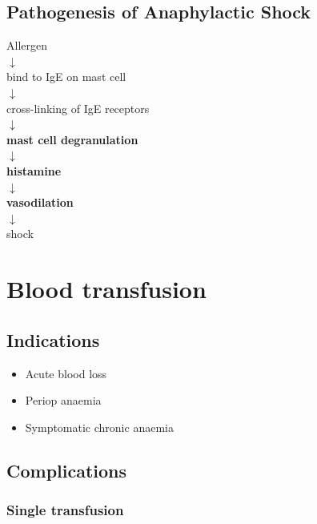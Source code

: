 \documentclass[
  14pt,
]{memoir}
\providecommand{\tightlist}{%
  \setlength{\itemsep}{0pt}\setlength{\parskip}{0pt}}
\begin{document}
\hypertarget{pathogenesis-of-anaphylactic-shock}{%
\section{Pathogenesis of Anaphylactic
Shock}\label{pathogenesis-of-anaphylactic-shock}}

\begin{center}
Allergen \\
 $\downarrow$  \\
 bind to IgE on mast cell  \\
 $\downarrow$  \\
 cross-linking of IgE receptors  \\
 $\downarrow$  \\
 \textbf{mast cell degranulation}  \\
 $\downarrow$  \\
 \textbf{histamine}  \\
 $\downarrow$  \\
 \textbf{vasodilation}\\  
 $\downarrow$  \\
 shock\\
\end{center}

\pagebreak

\hypertarget{blood-transfusion}{%
\chapter{Blood transfusion}\label{blood-transfusion}}

\hypertarget{indications}{%
\section{Indications}\label{indications}}

\begin{itemize}
\tightlist
\item
  Acute blood loss
\item
  Periop anaemia
\item
  Symptomatic chronic anaemia
\end{itemize}

\hypertarget{complications}{%
\section{Complications}\label{complications}}

\hypertarget{single-transfusion}{%
\subsection{Single transfusion}\label{single-transfusion}}
\end{document}
